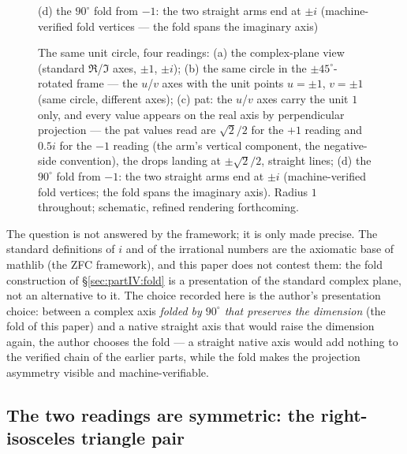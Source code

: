 \documentclass{article}
\begin{document}
\begin{figure}[ht]
\begin{minipage}[t]{0.48\textwidth}
\begin{tikzpicture}[scale=1.25, >=Stealth]
\end{tikzpicture}
{\small (d) the $90^\circ$ fold from $-1$: the two straight arms end at $\pm i$ (machine-verified fold vertices --- the fold spans the imaginary axis)}
\end{minipage}
\caption{The same unit circle, four readings: (a) the complex-plane
view (standard $\Re$/$\Im$ axes, $\pm1$, $\pm i$); (b) the same circle in
the $\pm45^\circ$-rotated frame --- the $u$/$v$ axes with the unit points
$u{=}\pm1$, $v{=}\pm1$ (same circle, different axes); (c) pat: the
$u$/$v$ axes carry the unit $1$ only, and every value appears on the
real axis by perpendicular projection --- the pat values read are
$\sqrt2/2$ for the $+1$ reading and $0.5i$ for the $-1$ reading (the
arm's vertical component, the negative-side convention), the drops
landing at $\pm\sqrt2/2$, straight lines; (d) the $90^\circ$ fold from $-1$: the two straight arms end
at $\pm i$ (machine-verified fold vertices; the fold spans the
imaginary axis). Radius $1$ throughout; schematic,
refined rendering forthcoming.}
\label{fig:four_views}
\end{figure}

The question is not answered by the framework; it is only made precise.
The standard definitions of $i$ and of the irrational numbers are the
axiomatic base of mathlib (the ZFC framework), and this paper does not
contest them: the fold construction of \S\ref{sec:partIV:fold} is a
presentation of the standard complex plane, not an alternative to it.
The choice recorded here is the author's presentation choice: between a
complex axis \emph{folded by $90^\circ$ that preserves the dimension}
(the fold of this paper) and a native straight axis that would raise the
dimension again, the author chooses the fold --- a straight native axis
would add nothing to the verified chain of the earlier parts, while the
fold makes the projection asymmetry visible and machine-verifiable.

\subsection{The two readings are symmetric: the right-isosceles triangle pair}
\label{sec:partIV:tri}
\end{document}
